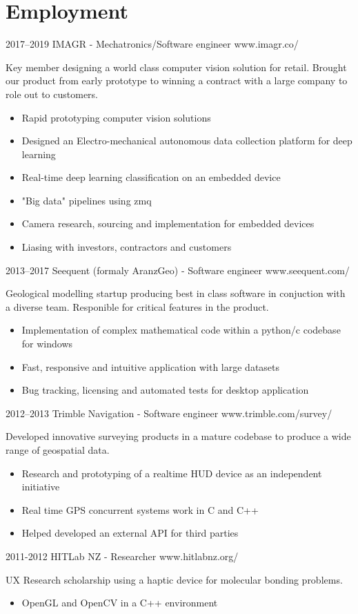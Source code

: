 \documentclass[print]{friggeri-cv} %
\begin{document}
\section{Employment}
\begin{entrylist}
\entry
{2017--2019}
{IMAGR - Mechatronics/Software engineer}
{www.imagr.co/}
{Key member designing a world class computer vision solution for retail. Brought our product from early prototype to winning a contract with a large company to role out to customers.
\begin{itemize}
\item Rapid prototyping computer vision solutions
\item Designed an Electro-mechanical autonomous data collection platform for deep learning
\item Real-time deep learning classification on an embedded device
\item "Big data" pipelines using zmq
\item Camera research, sourcing and implementation for embedded devices
\item Liasing with investors, contractors and customers
\end{itemize}}

\entry
{2013--2017}
{Seequent (formaly AranzGeo) - Software engineer}
{www.seequent.com/}
{Geological modelling startup producing best in class software in conjuction with a diverse team. Responible for critical features in the product.
\begin{itemize}
\item Implementation of complex mathematical code within a python/c codebase for windows
\item Fast, responsive and intuitive application with large datasets
\item Bug tracking, licensing and automated tests for desktop application
\end{itemize}}

\entry
{2012--2013}
{Trimble Navigation - Software engineer}
{www.trimble.com/survey/}
{Developed innovative surveying products in a mature codebase to produce a wide range of geospatial data.
\begin{itemize}
\item Research and prototyping of a realtime HUD device as an independent initiative
\item Real time GPS concurrent systems work in C and C++
\item Helped developed an external API for third parties
\end{itemize}}

\entry
{2011-2012}
{HITLab NZ - Researcher}
{www.hitlabnz.org/}
{UX Research scholarship using a haptic device for molecular bonding problems.
\begin{itemize}
\item OpenGL and OpenCV in a C++ environment 
\end{itemize}}
\end{entrylist}\\ 
\end{document}
